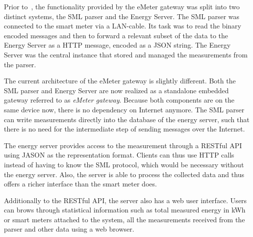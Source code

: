 Prior to~\cite{embedded_gateway}, the functionality provided by the eMeter gateway was split into two distinct systems, the SML parser and the Energy Server. 
The SML parser was connected to the smart meter via a LAN-cable. Its task was to read the binary encoded messages and then to forward a relevant subset of the data to the Energy Server as a HTTP message, encoded as a JSON string. The Energy Server was the central instance that stored and managed the measurements from the parser. 

The current architecture of the eMeter gateway is slightly different. Both the SML parser and Energy Server are now realized as a standalone embedded gateway referred to as \textit{eMeter gateway}.
Because both components are on the same device now, there is no dependency on Internet anymore. The SML parser can write measurements directly into the database of the energy server, such that there is no need for the intermediate step of sending messages over the Internet. 

The energy server provides access to the measurement through a RESTful API using JASON as the representation format. Clients can thus use HTTP calls instead of having to know the SML protocol, which would be necessary without the energy server. Also, the server is able to process the collected data and thus offers a richer interface than the smart meter does. 

Additionally to the RESTful API, the server also has a web user interface. Users can brows through statistical information such as total measured energy in kWh or smart meters attached to the system, all the measurements received from the parser and other data using a web browser.

